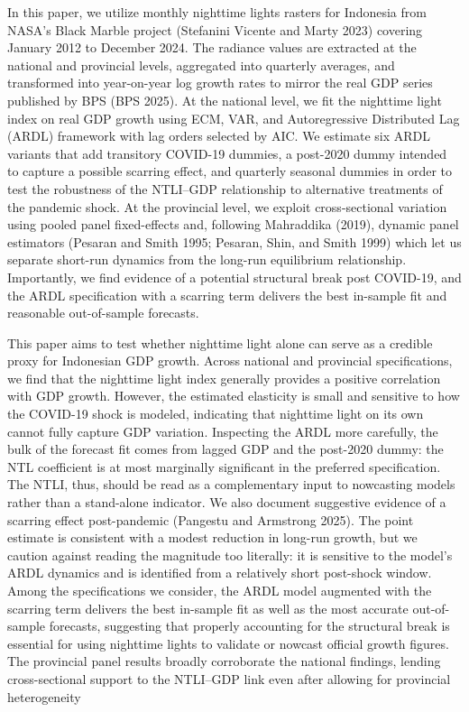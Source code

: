 \documentclass[
  manuscript=article,
  layout=publish,
  year=2026,
  volume=3,
]{den}
\begin{document}
In this paper, we utilize monthly nighttime lights rasters for Indonesia
from NASA's Black Marble project (Stefanini Vicente and Marty 2023)
covering January 2012 to December 2024. The radiance values are
extracted at the national and provincial levels, aggregated into
quarterly averages, and transformed into year-on-year log growth rates
to mirror the real GDP series published by BPS (BPS 2025). At the
national level, we fit the nighttime light index on real GDP growth
using ECM, VAR, and Autoregressive Distributed Lag (ARDL) framework with
lag orders selected by AIC. We estimate six ARDL variants that add
transitory COVID-19 dummies, a post-2020 dummy intended to capture a
possible scarring effect, and quarterly seasonal dummies in order to
test the robustness of the NTLI--GDP relationship to alternative
treatments of the pandemic shock. At the provincial level, we exploit
cross-sectional variation using pooled panel fixed-effects and,
following Mahraddika (2019), dynamic panel estimators (Pesaran and Smith
1995; Pesaran, Shin, and Smith 1999) which let us separate short-run
dynamics from the long-run equilibrium relationship. Importantly, we
find evidence of a potential structural break post COVID-19, and the
ARDL specification with a scarring term delivers the best in-sample fit
and reasonable out-of-sample forecasts.

This paper aims to test whether nighttime light alone can serve as a
credible proxy for Indonesian GDP growth. Across national and provincial
specifications, we find that the nighttime light index generally
provides a positive correlation with GDP growth. However, the estimated
elasticity is small and sensitive to how the COVID-19 shock is modeled,
indicating that nighttime light on its own cannot fully capture GDP
variation. Inspecting the ARDL more carefully, the bulk of the forecast
fit comes from lagged GDP and the post-2020 dummy: the NTL coefficient
is at most marginally significant in the preferred specification. The
NTLI, thus, should be read as a complementary input to nowcasting models
rather than a stand-alone indicator. We also document suggestive
evidence of a scarring effect post-pandemic (Pangestu and Armstrong
2025). The point estimate is consistent with a modest reduction in
long-run growth, but we caution against reading the magnitude too
literally: it is sensitive to the model's ARDL dynamics and is
identified from a relatively short post-shock window. Among the
specifications we consider, the ARDL model augmented with the scarring
term delivers the best in-sample fit as well as the most accurate
out-of-sample forecasts, suggesting that properly accounting for the
structural break is essential for using nighttime lights to validate or
nowcast official growth figures. The provincial panel results broadly
corroborate the national findings, lending cross-sectional support to
the NTLI--GDP link even after allowing for provincial heterogeneity
\end{document}
